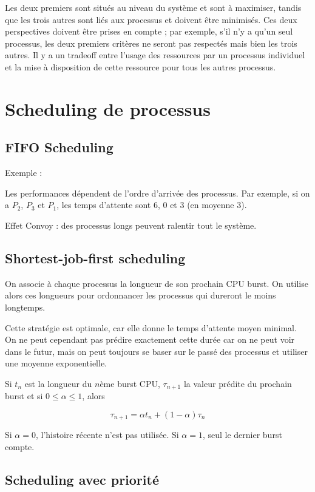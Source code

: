 Les deux premiers sont situés au niveau du système et sont à maximiser, tandis que les trois autres sont liés aux processus et doivent être minimisés. Ces deux perspectives doivent être prises en compte ; par exemple, s'il n'y a qu'un seul processus, les deux premiers critères ne seront pas respectés mais bien les trois autres. Il y a un tradeoff entre l'usage des ressources par un processus individuel et la mise à disposition de cette ressource pour tous les autres processus.

\section{Scheduling de processus}

\subsection{FIFO Scheduling}

Exemple :


Les performances dépendent de l'ordre d'arrivée des processus. Par exemple, si on a $P_2$, $P_3$ et $P_1$, les temps d'attente sont 6, 0 et 3 (en moyenne 3).

Effet Convoy : des processus longs peuvent ralentir tout le système.

\subsection{Shortest-job-first scheduling}

On associe à chaque processus la longueur de son prochain CPU burst. On utilise alors ces longueurs pour ordonnancer les processus qui dureront le moins longtemps.

Cette stratégie est optimale, car elle donne le temps d'attente moyen minimal. On ne peut cependant pas prédire exactement cette durée car on ne peut voir dans le futur, mais on peut toujours se baser sur le passé des processus et utiliser une moyenne exponentielle.

Si $t_n$ est la longueur du $n$ème burst CPU, $\tau_{n+1}$ la valeur prédite du prochain burst et si $0 \leq \alpha \leq 1$, alors

$$\tau_{n + 1} = \alpha t_n + (1 - \alpha) \tau_n$$

Si $\alpha = 0$, l'histoire récente n'est pas utilisée. Si $\alpha = 1$, seul le dernier burst compte.

\subsection{Scheduling avec priorité}

